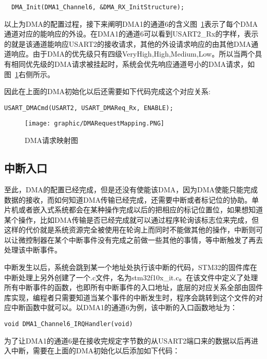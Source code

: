 \textit{\color{blue}{//把刚才上面结构体定义的参数初始化到DMA1的通道6}}

\verb|	DMA_Init(DMA1_Channel6, &DMA_RX_InitStructure);|

以上为DMA的配置过程，接下来阐明DMA1的通道6的含义图~\ref{DMACorresponding}表示了每个DMA通道对应的能响应的外设。在DMA1的通道6可以看到USART2\_{}Rx的字样，表示的就是该通道能响应USART2的接收请求，其他的外设请求响应的由其他DMA通道响应。由于DMA的优先级只有四级VeryHigh,High,Medium,Low。所以当两个具有相同优先级的DMA请求被挂起时，系统会优先响应通道号小的DMA请求，如图~\ref{DMACorresponding}右侧所示。

	因此在上面的DMA初始化以后还需要如下代码完成这个对应关系:

	\verb|USART_DMACmd(USART2, USART_DMAReq_Rx, ENABLE);|

\begin{figure}[!hbp]
\begin{center}
\texttt{[image: graphic/DMARequestMapping.PNG]}
\caption{DMA请求映射图 \label{DMACorresponding}}
\end{center}
\end{figure}

\subsection{中断入口}

	至此，DMA的配置已经完成，但是还没有使能该DMA，因为DMA使能只能完成数据的接收，而如何知道DMA传输已经完成，还需要中断或者标记位的协助。单片机或者嵌入式系统都会在某种操作完成以后的把相应的标记位置位，如果想知道某个操作，比如DMA传输是否已经完成就可以通过程序轮询该标志位来完成，但这样的代价就是系统资源完全被使用在轮询上而同时不能做其他的操作，中断则可以让微控制器在某个中断事件没有完成之前做一些其他的事情，等中断触发了再去处理该中断事件。

	中断发生以后，系统会跳到某一个地址处执行该中断的代码，STM32的固件库在中断处理上另外创建了一个.c文件，名为stm32f10x\_{}it.c。在该文件中定义了处理所有中断事件的函数，也即所有中断事件的入口地址，底层的对应关系全部由固件库实现，编程者只需要知道当某个事件的中断发生时，程序会跳转到这个文件的对应中断函数中就可以。以DMA1的通道6为例，该中断的入口函数地址为：
\begin{center}
\verb|void DMA1_Channel6_IRQHandler(void)|
\end{center}

为了让DMA1的通道6是在接收完规定字节数的从USART2端口来的数据以后再进入中断，需要在上面的DMA初始化以后添加如下代码：

